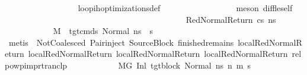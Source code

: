 \begin{isabellebody}
\ \ \ \ \ \ \ \ \ \ \ \ \ \ \ \ \isamarkupfalse%
\ loop{\isacharunderscore}{\kern0pt}ih{\isacharunderscore}{\kern0pt}optimizations{\isacharunderscore}{\kern0pt}def\isanewline
\ \ \ \ \ \ \ \ \ \ \ \ \ \ \ \ \isamarkupfalse%
\ {\isacharparenleft}{\kern0pt}meson\ diff{\isacharunderscore}{\kern0pt}le{\isacharunderscore}{\kern0pt}self{\isacharparenright}{\kern0pt}\isanewline
\ \ \ \ \ \ \ \ \ \ \ \ \isamarkupfalse%
\isanewline
\ \ \ \ \ \ \ \ \ \ \isamarkupfalse%
\isanewline
\ \ \ \ \ \ \ \ \isamarkupfalse%
\isanewline
\ \ \ \ \ \ \ \ \ \ \isamarkupfalse%
\ {\isacharparenleft}{\kern0pt}RedNormalReturn\ cs\ ns{\isacharprime}{\kern0pt}{\isacharparenright}{\kern0pt}\isanewline
\ \ \ \ \ \ \ \ \ \ \isamarkupfalse%
\ {\isachardoublequoteopen}M{\isacharcomma}{\kern0pt}{\isasymLambda}{\isacharcomma}{\kern0pt}{\isasymGamma}{\isacharcomma}{\kern0pt}{\isasymOmega}\ {\isasymturnstile}\ {\isasymlangle}tgt{\isacharunderscore}{\kern0pt}cmds{\isacharcomma}{\kern0pt}\ Normal\ ns{\isasymrangle}\ {\isacharbrackleft}{\kern0pt}{\isasymrightarrow}{\isacharbrackright}{\kern0pt}\ s{\isacharprime}{\kern0pt}{\isachardoublequoteclose}\isanewline
\ \ \ \ \ \ \ \ \ \ \ \ \isamarkupfalse%
\ {\isacharparenleft}{\kern0pt}metis\ {\isachardoublequoteopen}{}{\isachardoublequoteclose}{\isacharparenleft}{\kern0pt}{}{\isacharparenright}{\kern0pt}\ NotCoalesced\ Pair{\isacharunderscore}{\kern0pt}inject\ SourceBlock\ finished{\isacharunderscore}{\kern0pt}remains\ local{\isachardot}{\kern0pt}RedNormalReturn{\isacharparenleft}{\kern0pt}{}{\isacharparenright}{\kern0pt}\ local{\isachardot}{\kern0pt}RedNormalReturn{\isacharparenleft}{\kern0pt}{}{\isacharparenright}{\kern0pt}\ local{\isachardot}{\kern0pt}RedNormalReturn{\isacharparenleft}{\kern0pt}{}{\isacharparenright}{\kern0pt}\ local{\isachardot}{\kern0pt}RedNormalReturn{\isacharparenleft}{\kern0pt}{}{\isacharparenright}{\kern0pt}\ relpowp{\isacharunderscore}{\kern0pt}imp{\isacharunderscore}{\kern0pt}rtranclp{\isacharparenright}{\kern0pt}\isanewline
\ \ \ \ \ \ \ \ \ \ \isamarkupfalse%
\ {\isachardoublequoteopen}M{\isacharcomma}{\kern0pt}{\isasymLambda}{\isacharcomma}{\kern0pt}{\isasymGamma}{\isacharcomma}{\kern0pt}{\isasymOmega}{\isacharcomma}{\kern0pt}G{\isacharprime}{\kern0pt}\ {\isasymturnstile}{\isacharparenleft}{\kern0pt}Inl\ tgt{\isacharunderscore}{\kern0pt}block{\isacharcomma}{\kern0pt}\ Normal\ ns{\isacharparenright}{\kern0pt}\ {\isacharminus}{\kern0pt}n{\isasymrightarrow}\ {\isacharparenleft}{\kern0pt}m{\isacharprime}{\kern0pt}{\isacharcomma}{\kern0pt}\ s{\isacharprime}{\kern0pt}{\isacharparenright}{\kern0pt}{\isachardoublequoteclose}\isanewline

\end{isabellebody}
